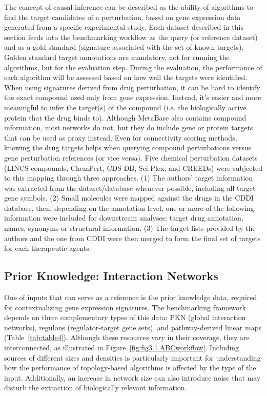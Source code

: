 The concept of causal inference can be described as the ability of algorithms to find the target candidates of a perturbation, based on gene expression data generated from a specific experimental study. 
Each dataset described in this section feeds into the benchmarking workflow as the query (or reference dataset) and as a gold standard (signature associated with the set of known targets). 
Golden standard target annotations are mandatory, not for running the algorithms, but for the evaluation step. 
During the evaluation, the performance of each algorithm will be assessed based on how well the targets were identified. 
When using signatures derived from drug perturbation, it can be hard to identify the exact compound used only from gene expression. 
Instead, it's easier and more meaningful to infer the target(s) of the compound (i.e. the biologically active protein that the drug binds to). 
Although MetaBase also contains compound information, most networks do not, but they do include gene or protein targets that can be used as proxy instead.  
Even for connectivity scoring methods, knowing the drug targets helps when querying compound perturbations versus gene perturbation references (or vice versa). 
Five chemical perturbation datasets (LINCS compounds, ChemPert, CDS-DB, Sci-Plex, and CREEDs) were subjected to this mapping through three approaches. 
(1) The authors' target information was extracted from the dataset/database whenever possible, including all target gene symbols. 
(2) Small molecules were mapped against the drugs in the CDDI database,  then,  depending on the annotation level, one or more of the following information were included for downstream analyses: target drug annotation, names, synonyms or structural information. 
(3) The target lists provided by the authors and the one from \gls{CDDI} were then merged to form the final set of targets for each therapeutic agents.



\subsection{Prior Knowledge: Interaction Networks} %
\label{sec:priorknowledgeinteractionnetworks}

One of inputs that can serve as a reference is the prior knowledge data, required for contextualizing gene expression signatures. 
The benchmarking framework depends on three complementary types of this data: \gls{PKN} (global interaction networks), regulons (regulator-target gene sets), and pathway-derived linear maps (Table~\ref{tab:table4}). 
Although these resources vary in their coverage, they are interconnected, as illustrated in Figure~\ref{fig:fig3.1.ABCworkflow}. 
Including sources of different sizes and densities is particularly important for understanding how the performance of topology-based algorithms is affected by the type of the input. 
Additionally, an increase in network size can also introduce noise that may disturb the extraction of biologically relevant information. 

